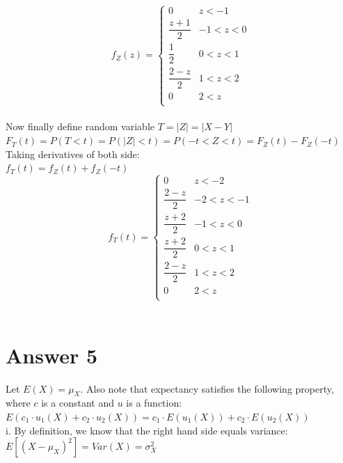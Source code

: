 \documentclass[12pt]{article}
\begin{document}
\[  f_Z(z) = \begin{cases} 
		0 & z < -1\\
     	\dfrac{z+1}{2}   & -1 < z < 0 \\
       \dfrac{1}{2}& 0 < z < 1 \\ 
        \dfrac{2-z}{2} & 1 < z < 2 \\
       0 & 2 < z \\
      
   \end{cases}
\] \\

Now finally define random variable $T = |Z| = |X-Y|$ \\

$F_T(t) = P(T<t) = P(|Z|<t) = P( -t < Z < t) = F_Z(t) - F_Z(-t) $ \\

Taking derivatives of both side: \\

$f_T(t) = f_Z(t)+f_Z(-t) $\\


\[  f_T(t) = \begin{cases} 
		0 & z < -2		\\
		\dfrac{2-z}{2} & -2 < z < -1\\
     	\dfrac{z+2}{2} & -1 < z < 0 \\
       \dfrac{z+2}{2} & 0 < z < 1 \\ 
       \dfrac{2-z}{2} & 1 < z < 2 \\
       0 & 2 < z \\
      
   \end{cases}
\] \\

\section*{Answer 5}
\quad Let $E(X)=\mu_X$. Also note that expectancy satisfies the following property, where $c$ is a constant and $u$ is a function: \\

$E(c_1\cdot u_1(X) + c_2\cdot u_2(X)  ) = c_1\cdot E(u_1(X)) + c_2\cdot E( u_2(X) ) $ \\

i. By definition, we know that the right hand side equals variance: \\

$E[ (X-\mu_X)^2 ] = Var(X) = \sigma^2_X $ \\
\end{document}

